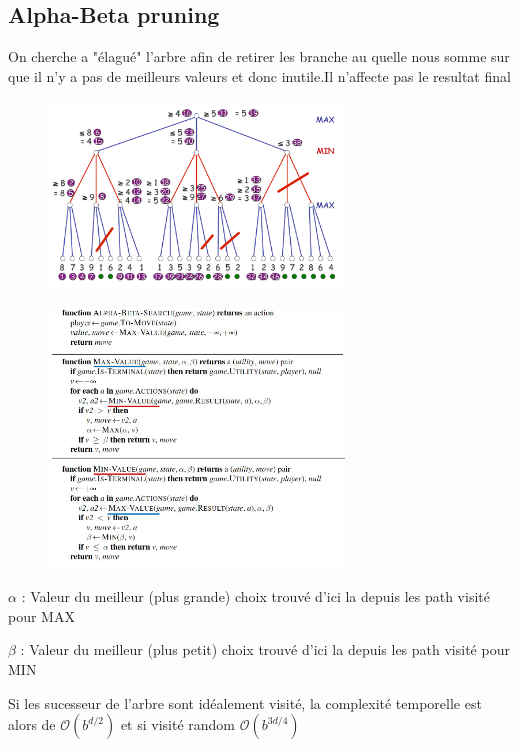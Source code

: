 	\subsection{Alpha-Beta pruning}
		On cherche a "élagué" l'arbre afin de retirer les branche au quelle nous somme sur que il n'y a pas de meilleurs valeurs et donc inutile.Il n'affecte pas le resultat final
		\begin{figure}[H]
			\centering
			\includegraphics[width=0.7\textwidth]{img/alphabeta.png}
		\end{figure}
		
		\begin{figure}[H]
			\centering
			\includegraphics[width=0.7\textwidth]{img/alphabetaalgo.png}
		\end{figure}
		
		$\alpha$ : Valeur du meilleur (plus grande) choix trouvé d'ici la depuis les path visité pour MAX
		
		$\beta$ : Valeur du meilleur (plus petit) choix trouvé d'ici la depuis les path visité pour MIN
		
		Si les sucesseur de l'arbre sont idéalement visité, la complexité temporelle est alors de $\mathcal{O}(b^{d/2})$ et si visité random $\mathcal{O}(b^{3d/4})$
		
